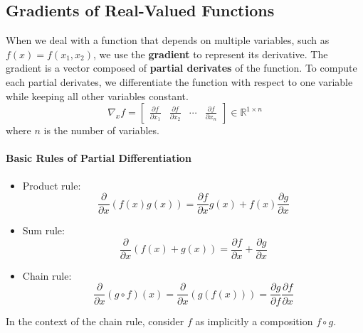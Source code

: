 \documentclass{article}
\begin{document}
\subsection{Gradients of Real-Valued Functions}
When we deal with a function that depends on multiple variables, such as 
$f(x)=f(x_1,x_2)$, we use the \textbf{gradient} to represent its derivative.
The gradient is a vector composed of \textbf{partial derivates} of the
function. To compute each partial derivates, we differentiate the function
with respect to one variable while keeping all other variables constant.
\begin{equation}\label{eq:gradient_real_valued_functions}
   \nabla_x f=\begin{bmatrix}
       \frac{\partial{f}}{\partial{x_1}} &
       \frac{\partial{f}}{\partial{x_2}} & \cdots &
       \frac{\partial{f}}{\partial{x_n}}
    \end{bmatrix}\in \mathbb{R}^{1\times n} 
\end{equation}
where $n$ is the number of variables.
\paragraph{Basic Rules of Partial Differentiation}
\begin{itemize}
    \item[] Product rule:
        $$\frac{\partial}{\partial{x}}(f(x)g(x))=\frac{\partial{f}}{\partial{x}}g(x)+f(x)\frac{\partial{g}}{\partial{x}}$$
    \item[] Sum rule:
        $$\frac{\partial}{\partial{x}}(f(x)+g(x))=\frac{\partial{f}}{\partial{x}}+\frac{\partial{g}}{\partial{x}}$$
    \item [] Chain rule:
        $$\frac{\partial}{\partial{x}}(g\circ
        f)(x)=\frac{\partial}{\partial{x}}\left(g(f(x))\right)=\frac{\partial{g}}{\partial{f}}\frac{\partial{f}}{\partial{x}}$$
\end{itemize}

In the context of the chain rule, consider $f$ as implicitly a composition
$f\circ g$.
\end{document}
